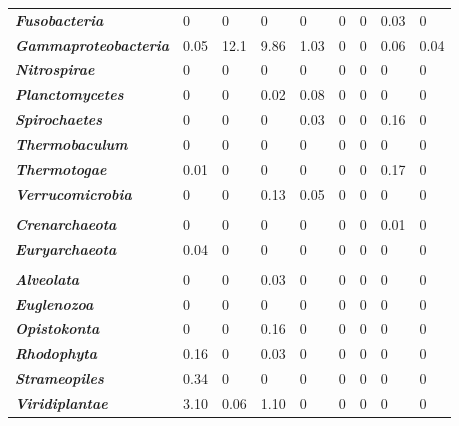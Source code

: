 \begin{table}
\begin{tabularx}{\textwidth}{p{3.5cm}XXXXXXXX}
\textbf{\emph{Fusobacteria}} & 0 & 0 & 0 & 0 & 0 & 0 & 0.03 & 0 \\
\textbf{\emph{Gammaproteobacteria}} & 0.05 & \cellcolor{blue!25}12.1 & \cellcolor{blue!25}9.86 & 1.03 & 0 & 0 & 0.06 & 0.04 \\
\textbf{\emph{Nitrospirae}} & 0 & 0 & 0 & 0 & 0 & 0 & 0 & 0 \\
\textbf{\emph{Planctomycetes}} & 0 & 0 & 0.02 & 0.08 & 0 & 0 & 0 & 0 \\
\textbf{\emph{Spirochaetes}} & 0 & 0 & 0 & 0.03 & 0 & 0 & 0.16 & 0 \\
\textbf{\emph{Thermobaculum}} & 0 & 0 & 0 & 0  & 0  & 0  & 0 & 0 \\
\textbf{\emph{Thermotogae}} & 0.01 & 0 & 0 & 0 & 0 & 0 & 0.17 & 0 \\
\textbf{\emph{Verrucomicrobia}} & 0 & 0 & 0.13 & 0.05 & 0 & 0 & 0 & 0 \\
 &  &  &  &  &  &  &  &  \\
\textbf{\emph{Crenarchaeota}} & 0 & 0 & 0 & 0 & 0 & 0 & 0.01 & 0 \\
\textbf{\emph{Euryarchaeota}} & 0.04 & 0 & 0 & 0 & 0 & 0 & 0 & 0 \\
 &  &  &  &  &  &  &  &  \\
\textbf{\emph{Alveolata}} & 0 & 0 & 0.03 & 0 & 0 & 0 & 0 & 0 \\
\textbf{\emph{Euglenozoa}} & 0 & 0 & 0 & 0 & 0 & 0 & 0 & 0 \\
\textbf{\emph{Opistokonta}} & 0 & 0 & 0.16 & 0 & 0 & 0 & 0 & 0 \\
\textbf{\emph{Rhodophyta}} & 0.16 & 0 & 0.03 & 0 & 0 & 0 & 0 & 0 \\
\textbf{\emph{Strameopiles}} & 0.34 & 0 & 0 & 0 & 0 & 0 & 0 & 0 \\
\textbf{\emph{Viridiplantae}} & \cellcolor{blue!25}3.10 & 0.06 & 1.10 & 0 & 0 & 0 & 0 & 0 \\
\bottomrule
\end{tabularx}
\end{table}

